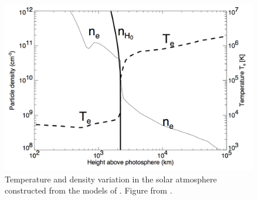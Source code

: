 

\begin{figure}[!t]
\begin{center}
\includegraphics[scale=0.3]{images/FAL-C.png}
\caption[The temperature and density as a function of height above the photosphere]{Temperature and density variation in the solar atmosphere constructed from the models of \citet{vernazza1981, fontenla1988, gabriel1976}. Figure from \citet{asch2004}.}
\label{fig:val} 
\end{center}
\end{figure}


